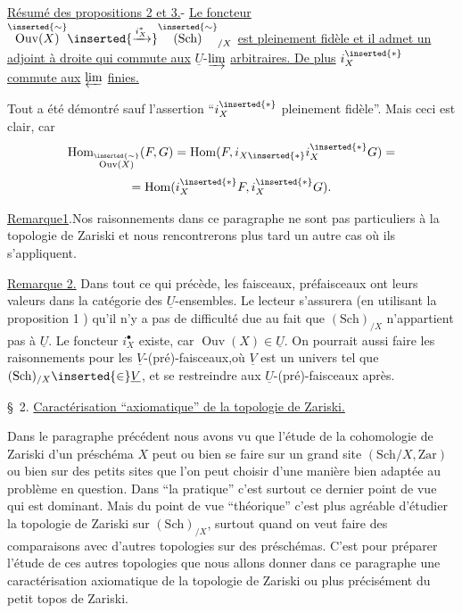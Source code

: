 
\uline{Résumé des propositions 2 et 3.}- \uline{Le foncteur}
$\overset{\inserted{\sim}}{\operatorname{Ouv}(X)}\inserted{\xrightarrow{i_X^*}}\overset{\inserted{\sim}}{(\mathrm{Sch})}_{/X}$
\uline{est pleinement fidèle et il admet un adjoint à droite qui commute aux} $\underline{U}$-$\varinjlim$ \uline{arbitraires. De plus} $i_X^{\inserted{*}}$ \uline{commute aux} $\varprojlim$ \uline{finies.}

Tout a été démontré sauf l'assertion ``$i_X^{\inserted{*}}$ pleinement fidèle''.
Mais ceci est clair, car
\[
\operatorname{Hom}_{\overset{\inserted{\sim}}{\operatorname{Ouv}(X)}}(F,G)=\operatorname{Hom}(F,i_{X\inserted{*}}i_X^{\inserted{*}}G)=
\]
\[
=\operatorname{Hom}(i_X^{\inserted{*}}F,i_X^{\inserted{*}}G).
\]

\uline{Remarque1}.Nos raisonnements dans ce paragraphe ne sont pas particuliers à la topologie de Zariski et nous rencontrerons plus tard un autre cas où ils s'appliquent.

\uline{Remarque 2.} Dans tout ce qui précède, les faisceaux, préfaisceaux ont leurs valeurs dans la catégorie des $\underline{U}$-ensembles. Le lecteur s'assurera (en utilisant la proposition 1 ) qu'il n'y a pas de difficulté due au fait que $(\mathrm{Sch})_{/X}$ n'appartient pas à $\underline{U}$. Le foncteur $i_X^\bullet$ existe, car $\operatorname{Ouv}(X)\in\underline{U}$. On pourrait aussi faire les raisonnements pour les $\underline{V}$-(pré)-faisceaux,où $\underline{V}$ est un univers tel que $(\mathrm{Sch})_{/X}\inserted{\in}\underline{V}$, et se restreindre aux $\underline{U}$-(pré)-faisceaux après.

\S\ 2. \uline{Caractérisation ``axiomatique'' de la topologie de Zariski.}

Dans le paragraphe précédent nous avons vu que l'étude de la cohomologie de Zariski d'un préschéma $X$ peut ou bien se faire sur un grand site $(\mathrm{Sch}/X,\mathrm{Zar})$ ou bien sur des petits sites que l'on peut choisir d'une manière bien adaptée au problème en question. Dans ``la pratique'' c'est surtout ce dernier point de vue qui est dominant. Mais du point de vue ``théorique'' c'est plus agréable d'étudier la topologie de Zariski sur $(\mathrm{Sch})_{/X}$, surtout quand on veut faire des comparaisons avec d'autres topologies sur des préschémas. C'est pour préparer l'étude de ces autres topologies que nous allons donner dans ce paragraphe une caractérisation axiomatique de la topologie de Zariski ou plus précisément du petit topos de Zariski.
